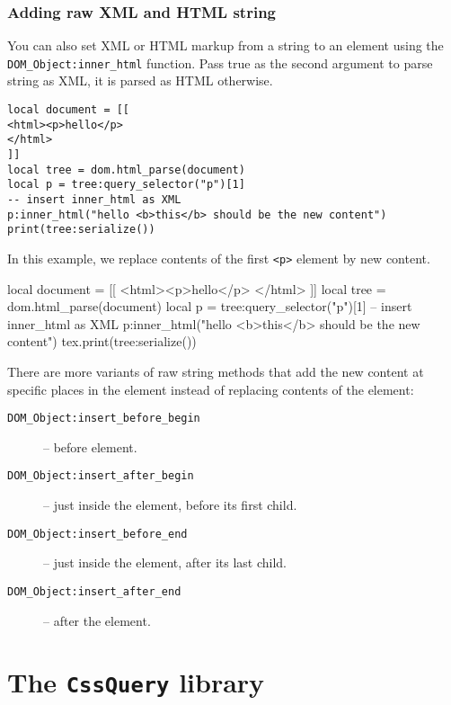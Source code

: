 \documentclass{ltxdoc}
\begin{document}
\subsubsection{Adding raw XML and HTML string}

You can also set XML or HTML markup from a string to an element using the \texttt{DOM\_Object:inner\_html} function. 
Pass true as the second argument to parse string as XML, it is parsed as HTML otherwise.


\begin{verbatim}
local document = [[
<html><p>hello</p>
</html>
]]
local tree = dom.html_parse(document)
local p = tree:query_selector("p")[1]
-- insert inner_html as XML
p:inner_html("hello <b>this</b> should be the new content")
print(tree:serialize())
\end{verbatim}

In this example, we replace contents of the first \verb|<p>| element by new content. 

\begin{framed}
  \ttfamily
  \begin{luacode*}
local document = [[
<html><p>hello</p>
</html>
]]
local tree = dom.html_parse(document)
local p = tree:query_selector("p")[1]
-- insert inner_html as XML
p:inner_html("hello <b>this</b> should be the new content")
tex.print(tree:serialize())
  \end{luacode*}
\end{framed}

There are more variants of raw string methods that add the new content at specific places in the element instead of replacing contents 
of the element:

\begin{description}
  \item[\texttt{DOM\_Object:insert\_before\_begin}] -- before element.
  \item[\texttt{DOM\_Object:insert\_after\_begin}] -- just inside the element, before its first child.
  \item[\texttt{DOM\_Object:insert\_before\_end}] -- just inside the element, after its last child.
  \item[\texttt{DOM\_Object:insert\_after\_end}] -- after the element.
\end{description}


\section{The \texttt{CssQuery} library}
\label{sec:cssquery_library}
\end{document}

